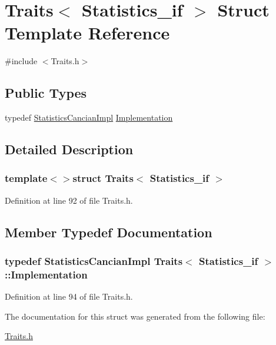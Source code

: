 \hypertarget{struct_traits_3_01_statistics__if_01_4}{\section{Traits$<$ Statistics\-\_\-if $>$ Struct Template Reference}
\label{struct_traits_3_01_statistics__if_01_4}
}


{\ttfamily \#include $<$Traits.\-h$>$}

\subsection*{Public Types}
\begin{DoxyCompactItemize}
\item 
typedef \hyperlink{class_statistics_cancian_impl}{Statistics\-Cancian\-Impl} \hyperlink{struct_traits_3_01_statistics__if_01_4_a96b3a1f9dc72c141d92f389c86907228}{Implementation}
\end{DoxyCompactItemize}


\subsection{Detailed Description}
\subsubsection*{template$<$$>$struct Traits$<$ Statistics\-\_\-if $>$}



Definition at line 92 of file Traits.\-h.



\subsection{Member Typedef Documentation}
\hypertarget{struct_traits_3_01_statistics__if_01_4_a96b3a1f9dc72c141d92f389c86907228}{
\subsubsection[{Implementation}]{\setlength{\rightskip}{0pt plus 5cm}typedef {\bf Statistics\-Cancian\-Impl} {\bf Traits}$<$ {\bf Statistics\-\_\-if} $>$\-::{\bf Implementation}}}\label{struct_traits_3_01_statistics__if_01_4_a96b3a1f9dc72c141d92f389c86907228}


Definition at line 94 of file Traits.\-h.



The documentation for this struct was generated from the following file\-:\begin{DoxyCompactItemize}
\item 
\hyperlink{_traits_8h}{Traits.\-h}\end{DoxyCompactItemize}
